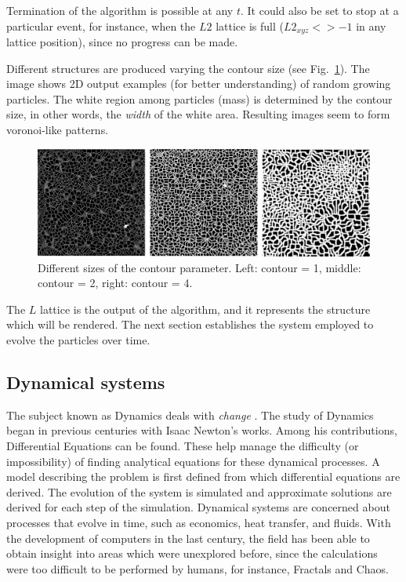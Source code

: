 \documentclass[oneside,a4paper,english,links]{amca}
\begin{document}
Termination of the algorithm is possible at any $t$. It could also be set to stop at a particular event, for instance, when the $L2$ lattice is full ($L2_{xyz} <> -1$ in any lattice position), since no progress can be made.

Different structures are produced varying the contour size (see Fig.~\ref{fg:fig1}). The image shows 2D output examples (for better understanding) of random growing particles. The white region among particles (mass) is determined by the contour size, in other words, the {\em width} of the white area. Resulting images seem to form voronoi-like patterns.


\begin{figure}[htb!]
  \centerline{\includegraphics[scale=0.22]{fig1.pdf}}
  \caption{Different sizes of the contour parameter. Left: contour = 1, middle: contour = 2, right: contour = 4.}
  \label{fg:fig1}
\end{figure}

The $L$ lattice is the output of the algorithm, and it represents the
structure which will be rendered. The
next section establishes the system employed to evolve the particles
over time.

\subsection{Dynamical systems}

The subject known as Dynamics deals with {\em change}
\citep{Strogatz2001}. The study of Dynamics began in previous
centuries with Isaac Newton's works. Among his contributions,
Differential Equations can be found. These help manage the
difficulty (or impossibility) of finding analytical equations for
these dynamical processes. A model describing the problem is
first defined from which differential equations are derived. The
evolution of the system is simulated and approximate solutions are
derived for each step of the simulation. Dynamical systems are
concerned about processes that evolve in time, such as economics, heat
transfer, and fluids. With the development of computers in the last
century, the field has been able to obtain insight into areas which
were unexplored before, since the calculations were too difficult to
be performed by humans, for instance, Fractals \citep{Mandelbrot83}
and Chaos.
\end{document}
